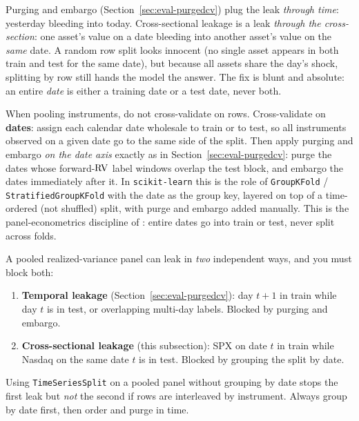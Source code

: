 \begin{intuition}
Purging and embargo (Section~\ref{sec:eval-purgedcv}) plug the leak \emph{through time}: yesterday bleeding into today.
Cross-sectional leakage is a leak \emph{through the cross-section}: one asset's value on a date bleeding into another asset's value on the \emph{same} date.
A random row split looks innocent (no single asset appears in both train and test for the same date), but because all assets share the day's shock, splitting by row still hands the model the answer.
The fix is blunt and absolute: an entire \emph{date} is either a training date or a test date, never both.
\end{intuition}

\begin{keyidea}
When pooling instruments, do not cross-validate on rows.
Cross-validate on \textbf{dates}: assign each calendar date wholesale to train or to test, so all instruments observed on a given date go to the same side of the split.
Then apply purging and embargo \emph{on the date axis} exactly as in Section~\ref{sec:eval-purgedcv}: purge the dates whose forward-$\operatorname{RV}$ label windows overlap the test block, and embargo the dates immediately after it.
In \texttt{scikit-learn} this is the role of \texttt{GroupKFold} / \texttt{StratifiedGroupKFold} with the date as the group key, layered on top of a time-ordered (not shuffled) split, with purge and embargo added manually.
This is the panel-econometrics discipline of \citet{LopezdePrado2018}: entire dates go into train or test, never split across folds.
\end{keyidea}

\begin{warning}
A pooled realized-variance panel can leak in \emph{two} independent ways, and you must block both:
\begin{enumerate}[nosep]
  \item \textbf{Temporal leakage} (Section~\ref{sec:eval-purgedcv}): day $t{+}1$ in train while day $t$ is in test, or overlapping multi-day labels. Blocked by purging and embargo.
  \item \textbf{Cross-sectional leakage} (this subsection): SPX on date $t$ in train while Nasdaq on the same date $t$ is in test. Blocked by grouping the split by date.
\end{enumerate}
Using \texttt{TimeSeriesSplit} on a pooled panel without grouping by date stops the first leak but \emph{not} the second if rows are interleaved by instrument. Always group by date first, then order and purge in time.
\end{warning}

